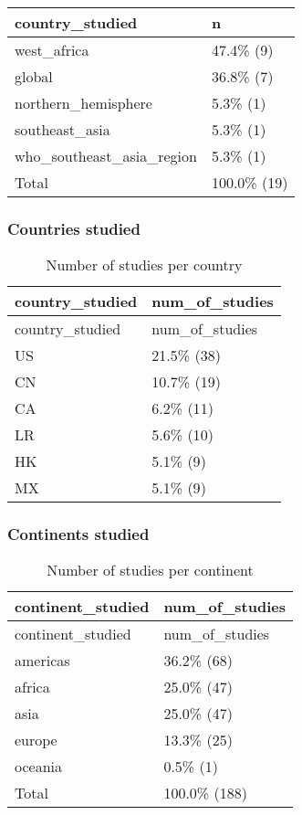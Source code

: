 \documentclass[
]{article}
\begin{document}
\begin{longtable}[]{@{}ll@{}}
\toprule
country\_studied & n \\
\midrule
\endhead
west\_africa & 47.4\% (9) \\
global & 36.8\% (7) \\
northern\_hemisphere & 5.3\% (1) \\
southeast\_asia & 5.3\% (1) \\
who\_southeast\_asia\_region & 5.3\% (1) \\
Total & 100.0\% (19) \\
\bottomrule
\end{longtable}

\hypertarget{countries-studied}{%
\subsubsection{Countries studied}\label{countries-studied}}

\begin{longtable}[]{@{}ll@{}}
\caption{Number of studies per country}\tabularnewline
\toprule
country\_studied & num\_of\_studies \\
\midrule
\endfirsthead
\toprule
country\_studied & num\_of\_studies \\
\midrule
\endhead
US & 21.5\% (38) \\
CN & 10.7\% (19) \\
CA & 6.2\% (11) \\
LR & 5.6\% (10) \\
HK & 5.1\% (9) \\
MX & 5.1\% (9) \\
\bottomrule
\end{longtable}

\hypertarget{continents-studied}{%
\subsubsection{Continents studied}\label{continents-studied}}

\begin{longtable}[]{@{}ll@{}}
\caption{Number of studies per continent}\tabularnewline
\toprule
continent\_studied & num\_of\_studies \\
\midrule
\endfirsthead
\toprule
continent\_studied & num\_of\_studies \\
\midrule
\endhead
americas & 36.2\% (68) \\
africa & 25.0\% (47) \\
asia & 25.0\% (47) \\
europe & 13.3\% (25) \\
oceania & 0.5\% (1) \\
Total & 100.0\% (188) \\
\bottomrule
\end{longtable}
\end{document}
